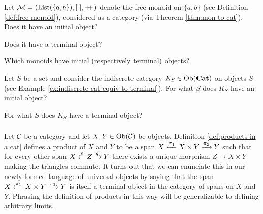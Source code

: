 \begin{exercise}
Let $\mathcal{M}=(\textnormal{List}(\{a,b\}),[\;],+\!\!+\hspace{1pt})$ denote the free monoid on $\{a,b\}$ (see Definition \ref{def:free monoid}), considered as a category (via Theorem \ref{thm:mon to cat}).
\sexc Does it have an initial object?
\item Does it have a terminal object?
\item Which monoids have initial (respectively terminal) objects?
\endsexc
\end{exercise}

\begin{exercise}
Let $S$ be a set and consider the indiscrete category $K_S\in\textnormal{Ob}({\bf Cat})$ on objects $S$ (see Example \ref{ex:indiscrete cat equiv to terminal}).
\sexc For what $S$ does $K_S$ have an initial object?
\item For what $S$ does $K_S$ have a terminal object?
\endsexc
\end{exercise}


\subsubsection{}\label{sec:examples of limits}

Let $\mathcal{C}$ be a category and let $X,Y\in\textnormal{Ob}(\mathcal{C})$ be objects. Definition \ref{def:products in a cat} defines a product  of $X$ and $Y$ to be a span $X\xleftarrow{\pi_1}X\times Y\xrightarrow{\pi_2}Y$ such that for every other span $X\xleftarrow{p}Z\xrightarrow{q}Y$ there exists a unique morphism $Z\to X\times Y$ making the triangles commute. It turns out that we can enunciate this in our newly formed language of universal objects by saying that the span $X\xleftarrow{\pi_1}X\times Y\xrightarrow{\pi_2}Y$ is itself a terminal object in the category of spans on $X$ and $Y$. Phrasing the definition of products in this way will be generalizable to defining arbitrary limits.

